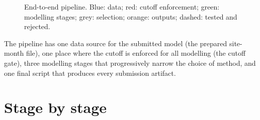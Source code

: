 \documentclass[11pt,letterpaper]{article}
\begin{document}
\begin{figure}[H]
\caption{End-to-end pipeline. Blue: data; red: cutoff enforcement; green: modelling stages;
grey: selection; orange: outputs; dashed: tested and rejected.}\label{fig:overview}
\end{figure}

\noindent The pipeline has one data source for the submitted model (the prepared site-month file), one
place where the cutoff is enforced for all modelling (the cutoff gate), three modelling stages that
progressively narrow the choice of method, and one final script that produces every submission artifact.

\section{Stage by stage}
\end{document}

